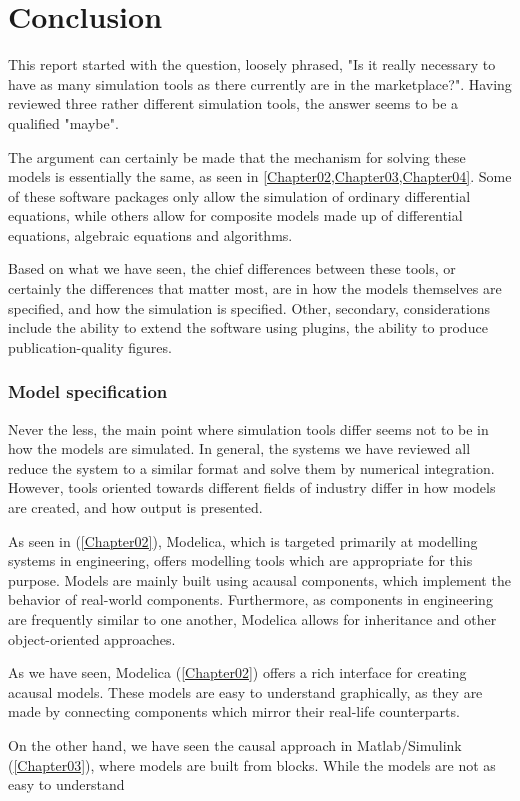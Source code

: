 \documentclass[\rootfolder/main.tex]{subfiles}
\begin{document}
\chapter{Conclusion} %

\label{Chapter06} %

This report started with the question, loosely phrased, "Is it really necessary to have as many simulation tools as there currently are in the marketplace?".
Having reviewed three rather different simulation tools, the answer seems to be a qualified "maybe".

The argument can certainly be made that the mechanism for solving these models is essentially the same, as seen in \cref{Chapter02,Chapter03,Chapter04}.
Some of these software packages only allow the simulation of ordinary differential equations, while others allow for composite models made up of differential equations, algebraic equations and algorithms.

Based on what we have seen, the chief differences between these tools, or certainly the differences that matter most, are in how the models themselves are specified, and how the simulation is specified.
Other, secondary, considerations include the ability to extend the software using plugins, the ability to produce publication-quality figures.

\subsection{Model specification}



Never the less, the main point where simulation tools differ seems not to be in how the models are simulated.
In general, the systems we have reviewed all reduce the system to a similar format and solve them by numerical integration.
However, tools oriented towards different fields of industry differ in how models are created, and how output is presented.

As seen in (\cref{Chapter02}), Modelica, which is targeted primarily at modelling systems in engineering, offers modelling tools which are appropriate for this purpose.
Models are mainly built using acausal components, which implement the behavior of real-world components.
Furthermore, as components in engineering are frequently similar to one another, Modelica allows for inheritance and other object-oriented approaches.

As we have seen, Modelica (\cref{Chapter02}) offers a rich interface for creating acausal models.
These models are easy to understand graphically, as they are made by connecting components which mirror their real-life counterparts.

On the other hand, we have seen the causal approach in Matlab/Simulink (\cref{Chapter03}), where models are built from blocks.
While the models are not as easy to understand 
\end{document}
